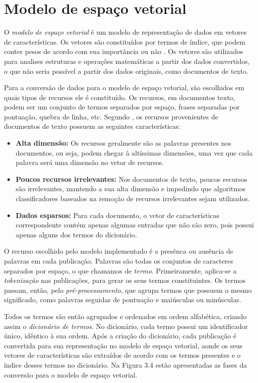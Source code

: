 \section{Modelo de espaço vetorial}

O \textit{modelo de espaço vetorial} é um modelo de representação de dados em vetores de características. Os vetores são constituídos por termos de índice, que podem conter pesos de acordo com sua importância ou não \cite{Salton1975}. Os vetores são utilizados para analises estruturas e operações matemáticas a partir dos dados convertidos, o que não seria possível a partir dos dados originais, como documentos de texto. 

Para a conversão de dados para o modelo de espaço vetorial, são escolhidos em quais tipos de recursos ele é constituído. Os recursos, em documentos texto, podem ser um conjunto de termos separados por espaço, frases separadas por pontuação, quebra de linha, etc. Segundo , os recursos provenientes de documentos de texto possuem as seguintes características:

\begin{itemize}
	\item \textbf{Alta dimensão:} Os recursos geralmente são as palavras presentes nos documentos, ou seja, podem chegar à altíssimas dimensões, uma vez que cada palavra será uma dimensão no vetor de recursos.
	\item \textbf{Poucos recursos irrelevantes:} Nos documentos de texto, poucos recursos são irrelevantes, mantendo a sua alta dimensão e impedindo que algoritmos classificadores baseados na remoção de recursos irrelevantes sejam utilizados.
	\item \textbf{Dados esparsos:} Para cada documento, o vetor de características correspondente contém apenas algumas entradas que não são zero, pois possui apenas alguns dos termos do dicionário.
\end{itemize}

O recurso escolhido pelo modelo implementado é a presênca ou ausência de palavras em cada publicação. Palavras são todas os conjuntos de caracteres separados por espaço, o que chamamos de \textit{termo}. Primeiramente, aplica-se a \textit{tokenização} nas publicações, para gerar os seus termos constituintes. Os termos passam, então, pelo \textit{pré-processamento}, que agrupa termos que possuem o mesmo significado, como palavras seguidas de pontuação e maiúsculas ou minúsculas. 

Todos os termos são então agrupados e ordenados em ordem alfabética, criando assim o \textit{dicionário de termos}. No dicionário, cada termo possui um identificador único, idêntico à sua ordem. Após a criação do dicionário, cada publicação é convertida para sua representação no modelo de espaço vetorial, aonde os seus vetores de características são extraídos de acordo com os termos presentes e o índice desses termos no dicionário. Na Figura 3.4 estão apresentadas as fases da conversão para o modelo de espaço vetorial.

